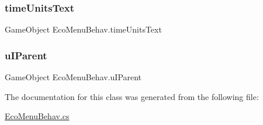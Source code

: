 \mbox{\label{class_eco_menu_behav_a369da6c213a6fbd04a4b641418714d59}} 
\subsubsection{\texorpdfstring{time\+Units\+Text}{timeUnitsText}}
{\footnotesize\ttfamily Game\+Object Eco\+Menu\+Behav.\+time\+Units\+Text}

\mbox{\label{class_eco_menu_behav_aa36609d2e9367f75aee215258da4fb65}} 
\subsubsection{\texorpdfstring{u\+I\+Parent}{uIParent}}
{\footnotesize\ttfamily Game\+Object Eco\+Menu\+Behav.\+u\+I\+Parent}



The documentation for this class was generated from the following file\+:\begin{DoxyCompactItemize}
\item 
\mbox{\hyperlink{_eco_menu_behav_8cs}{Eco\+Menu\+Behav.\+cs}}\end{DoxyCompactItemize}
